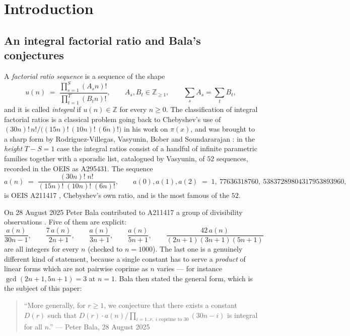 \documentclass[11pt]{article}
\theoremstyle{plain}
\theoremstyle{definition}
\theoremstyle{remark}
\numberwithin{equation}{section}
\newcommand{\Z}{\mathbb{Z}}
\begin{document}
\tableofcontents

\section{Introduction}
\label{sec:intro}

\subsection{An integral factorial ratio and Bala's conjectures}

A \emph{factorial ratio sequence} is a sequence of the shape
\begin{equation}
  u(n) \;=\; \frac{\prod_{s=1}^{S} (A_s n)!}{\prod_{t=1}^{T} (B_t n)!},
  \qquad A_s, B_t \in \Z_{\ge 1}, \qquad \sum_s A_s = \sum_t B_t ,
  \label{eq:ratio}
\end{equation}
and it is called \emph{integral} if $u(n) \in \Z$ for every $n \ge 0$. The classification of
integral factorial ratios is a classical problem going back to Chebyshev's use of
$(30n)!\,n!/\bigl((15n)!\,(10n)!\,(6n)!\bigr)$ in his work on $\pi(x)$, and was brought to a
sharp form by Rodriguez-Villegas, Vasyunin, Bober and Soundararajan
\cite{bober,rodriguezvillegas}: in the \emph{height} $T-S = 1$ case the integral ratios consist of
a handful of infinite parametric families together with a sporadic list, catalogued by Vasyunin,
of $52$ sequences, recorded in the OEIS as A295431. The sequence
\begin{equation}
  a(n) \;=\; \frac{(30n)!\; n!}{(15n)!\;(10n)!\;(6n)!},
  \qquad
  a(0),a(1),a(2) \;=\; 1,\ 77636318760,\ 53837289804317953893960,
  \label{eq:a}
\end{equation}
is OEIS A211417 \cite{oeis}, Chebyshev's own ratio, and is the most famous of the $52$.

On 28 August 2025 Peter Bala contributed to A211417 a group of divisibility observations
\cite{bala}. Five of them are explicit:
\[
  \frac{a(n)}{30n-1},\qquad
  \frac{7\,a(n)}{2n+1},\qquad
  \frac{a(n)}{3n+1},\qquad
  \frac{a(n)}{5n+1},\qquad
  \frac{42\,a(n)}{(2n+1)(3n+1)(5n+1)}
\]
are all integers for every $n$ (checked to $n = 1000$). The last one is a genuinely different kind
of statement, because a single constant has to serve a \emph{product} of linear forms which are
not pairwise coprime as $n$ varies --- for instance $\gcd(2n+1,5n+1) = 3$ at $n=1$. Bala then
stated the general form, which is the subject of this paper:

\begin{quote}
``More generally, for $r \ge 1$, we conjecture that there exists a constant $D(r)$ such that
$D(r) \cdot a(n) / \prod_{i=1..r,\; i \text{ coprime to } 30}(30n-i)$ is integral for all $n$.''
\hfill --- Peter Bala, 28 August 2025
\end{quote}
\end{document}
